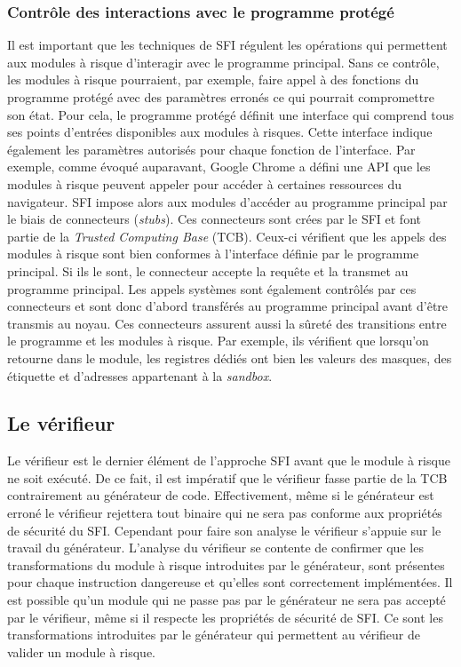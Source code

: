 \documentclass[11pt]{sdm}
\begin{document}
\subsubsection{Contrôle des interactions avec le programme protégé}

Il est important que les techniques de SFI régulent les opérations qui permettent aux modules à risque d'interagir avec le programme principal. Sans ce contrôle, les modules à risque pourraient, par exemple, faire appel à des fonctions du programme protégé avec des paramètres erronés ce qui pourrait compromettre son état.
Pour cela, le programme protégé définit une interface qui comprend tous ses points d'entrées disponibles aux modules à risques. Cette interface indique également les paramètres autorisés pour chaque fonction de l'interface. Par exemple, comme évoqué auparavant, Google Chrome a défini une API que les modules à risque peuvent appeler pour accéder à certaines ressources du navigateur.
SFI impose alors aux modules d'accéder au programme principal par le biais de connecteurs (\textit{stubs}). Ces connecteurs sont crées par le SFI et font partie de la \textit{Trusted Computing Base} (TCB). Ceux-ci vérifient que les appels des modules à risque sont bien conformes à l'interface définie par le programme principal. Si ils le sont, le connecteur accepte la requête et la transmet au programme principal. Les appels systèmes sont également contrôlés par ces connecteurs et sont donc d'abord transférés au programme principal avant d'être transmis au noyau.
Ces connecteurs assurent aussi la sûreté des transitions entre le programme et les modules à risque. Par exemple, ils vérifient que lorsqu'on retourne dans le module, les registres dédiés ont bien les valeurs des masques, des étiquette et d'adresses appartenant à la \textit{sandbox}.

\subsection{Le vérifieur}

Le vérifieur est le dernier élément de l'approche SFI avant que le module à risque ne soit exécuté. De ce fait, il est impératif que le vérifieur fasse partie de la TCB contrairement au générateur de code. Effectivement, même si le générateur est erroné le vérifieur rejettera tout binaire qui ne sera pas conforme aux propriétés de sécurité du SFI. Cependant pour faire son analyse le vérifieur s'appuie sur le travail du générateur. L'analyse du vérifieur se contente de confirmer que les transformations du module à risque introduites par le générateur, sont présentes pour chaque instruction dangereuse et qu'elles sont correctement implémentées.
Il est possible qu'un module qui ne passe pas par le générateur ne sera pas accepté par le vérifieur, même si il respecte les propriétés de sécurité de SFI. Ce sont les transformations introduites par le générateur qui permettent au vérifieur de valider un module à risque.
\end{document}
